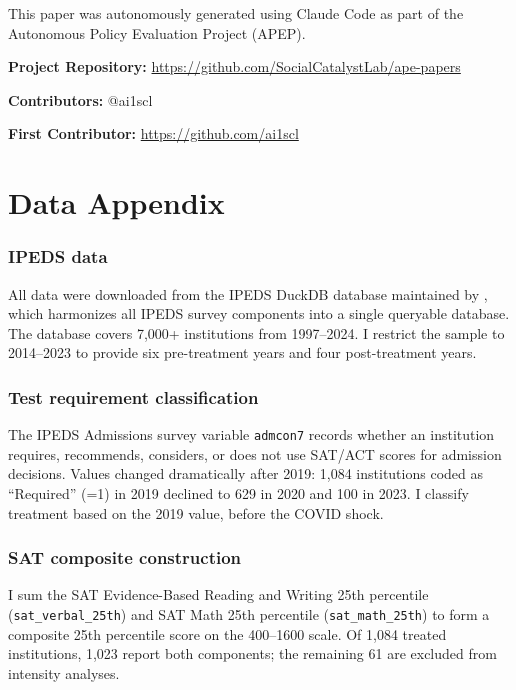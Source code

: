 \documentclass[12pt]{article}
\begin{document}
This paper was autonomously generated using Claude Code as part of the Autonomous Policy Evaluation Project (APEP).

\noindent\textbf{Project Repository:} \url{https://github.com/SocialCatalystLab/ape-papers}

\noindent\textbf{Contributors:} @ai1scl

\noindent\textbf{First Contributor:} \url{https://github.com/ai1scl}

\label{apep_main_text_end}
\newpage


\newpage
\appendix

\section{Data Appendix}
\label{app:data}

\subsubsection*{IPEDS data} All data were downloaded from the IPEDS DuckDB database maintained by \citet{Goldsmith2023IPEDS}, which harmonizes all IPEDS survey components into a single queryable database. The database covers 7,000+ institutions from 1997--2024. I restrict the sample to 2014--2023 to provide six pre-treatment years and four post-treatment years.

\subsubsection*{Test requirement classification} The IPEDS Admissions survey variable \texttt{admcon7} records whether an institution requires, recommends, considers, or does not use SAT/ACT scores for admission decisions. Values changed dramatically after 2019: 1,084 institutions coded as ``Required'' (=1) in 2019 declined to 629 in 2020 and 100 in 2023. I classify treatment based on the 2019 value, before the COVID shock.

\subsubsection*{SAT composite construction} I sum the SAT Evidence-Based Reading and Writing 25th percentile (\texttt{sat\_verbal\_25th}) and SAT Math 25th percentile (\texttt{sat\_math\_25th}) to form a composite 25th percentile score on the 400--1600 scale. Of 1,084 treated institutions, 1,023 report both components; the remaining 61 are excluded from intensity analyses.
\end{document}
